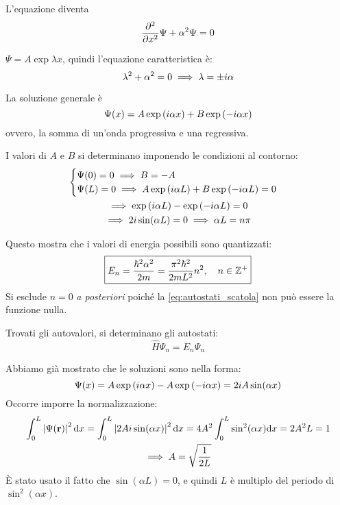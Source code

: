 L'equazione diventa
\begin{equation}
    \parder[][2]{x} \Psi + \alpha^2 \Psi = 0
\end{equation}

$\Psi = A \exp{\lambda x}$, quindi l'equazione caratteristica è:
\begin{equation}
    \lambda^2 + \alpha^2 = 0
    \implies
    \lambda = \pm i \alpha
\end{equation}

La soluzione generale è
\begin{equation}
    \Psi(x) = A \operatorname{exp}\left( i \alpha x \right) + B \operatorname{exp}\left( -i \alpha x \right)
\end{equation}
ovvero, la somma di un'onda progressiva e una regressiva.

I valori di $A$ e $B$ si determinano imponendo le condizioni al contorno:
\begin{gather}
    \begin{cases}
        \Psi(0) = 0 \implies B = -A \\
        \Psi(L) = 0 \implies A \operatorname{exp}\left( i \alpha L \right) + B \operatorname{exp}\left( -i \alpha L \right) = 0
    \end{cases} \\
    \implies \operatorname{exp}\left( i \alpha L \right) - \operatorname{exp}\left( -i \alpha L \right) = 0 \\
    \implies 2 i \sin(\alpha L) = 0
    \implies \alpha L = n \pi
\end{gather}

Questo mostra che i valori di energia possibili sono quantizzati:
\begin{equation}
    \boxed{E_n = \frac{\hbar^2 \alpha^2}{2 m} = \frac{\pi^2 \hbar^2}{2 m L^2} n^2, \quad
    n \in \mathbb{Z}^+}
\end{equation}
Si esclude $n = 0$ \textit{a posteriori} poiché la \eqref{eq:autostati_scatola} non può essere la funzione nulla.

Trovati gli autovalori, si determinano gli autostati:
\begin{equation}
    \hat{H} \Psi_n = E_n \Psi_n
\end{equation}

Abbiamo già mostrato che le soluzioni sono nella forma:
\begin{equation}
    \Psi(x) = A \operatorname{exp}\left( i \alpha x \right) - A \operatorname{exp}\left( -i \alpha x \right)
    = 2 i A \sin(\alpha x)
\end{equation}
Occorre imporre la normalizzazione:
\begin{gather}
    \int_0^L \left\lvert \Psi(\mathbf{r}) \right\rvert^2 \mathrm{d} x
    = \int_0^L \left\lvert 2 A i \sin(\alpha x) \right\rvert^2 \mathrm{d} x
    = 4 A^2 \int_0^L \sin^2(\alpha x) \mathrm{d} x
    = 2 A^2 L = 1 \\
    \implies
    A = \sqrt{\frac{1}{2 L}}
\end{gather}
È stato usato il fatto che $\sin(\alpha L) = 0$, e quindi $L$ è multiplo del periodo di $\sin^2(\alpha x)$.


